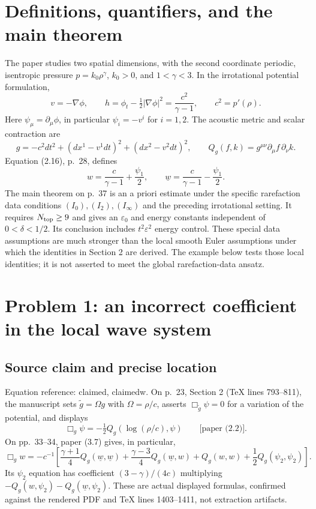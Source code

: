 \documentclass[10pt]{article}
\begin{document}
\section*{Definitions, quantifiers, and the main theorem}
The paper studies two spatial dimensions, with the second coordinate periodic, isentropic pressure \(p=k_0\rho^\gamma\), \(k_0>0\), and \(1<\gamma<3\). In the irrotational potential formulation, \[v=-\nabla\phi,\qquad
h=\phi_t-\tfrac12|\nabla\phi|^2=\frac{c^2}{\gamma-1},
\qquad c^2=p'(\rho).\] Here \(\psi_\mu=\partial_\mu\phi\), in particular \(\psi_i=-v^i\) for \(i=1,2\). The acoustic metric and scalar contraction are \[g=-c^2dt^2+(dx^1-v^1dt)^2+(dx^2-v^2dt)^2,\qquad
Q_g(f,k)=g^{\mu\nu}\partial_\mu f\,\partial_\nu k.\] Equation (2.16), p. 28, defines \[w=\frac{c}{\gamma-1}+\frac{\psi_1}{2},\qquad
\underline{w}=\frac{c}{\gamma-1}-\frac{\psi_1}{2}.\] The main theorem on p. 37 is an a priori estimate under the specific rarefaction data conditions \((I_0),(I_2),(I_\infty)\) and the preceding irrotational setting. It requires \(N_{\rm top}\geq9\) and gives an \(\varepsilon_0\) and energy constants independent of \(0<\delta<1/2\). Its conclusion includes \(t^2\varepsilon^2\) energy control. These special data assumptions are much stronger than the local smooth Euler assumptions under which the identities in Section 2 are derived. The example below tests those local identities; it is not asserted to meet the global rarefaction-data ansatz.\par
\section*{Problem 1: an incorrect coefficient in the local wave system}
\subsection*{Source claim and precise location}
Equation reference: claimed, claimedw. On p. 23, Section 2 (TeX lines 793–811), the manuscript sets \(\widetilde g=\Omega g\) with \(\Omega=\rho/c\), asserts \(\Box_{\widetilde g}\psi=0\) for a variation of the potential, and displays \[
\Box_g\psi=-\tfrac12Q_g(\log(\rho/c),\psi)
\qquad\text{[paper (2.2)].}\] On pp. 33–34, paper (3.7) gives, in particular, \[
\Box_gw=-c^{-1}\left[
\frac{\gamma+1}{4}Q_g(\underline{w},\underline{w})+
\frac{\gamma-3}{4}Q_g(\underline{w},w)+
Q_g(w,w)+\frac12Q_g(\psi_2,\psi_2)\right].\] Its \(\psi_2\) equation has coefficient \((3-\gamma)/(4c)\) multiplying \(-Q_g(w,\psi_2)-Q_g(\underline{w},\psi_2)\). These are actual displayed formulas, confirmed against the rendered PDF and TeX lines 1403–1411, not extraction artifacts.\par
\end{document}
